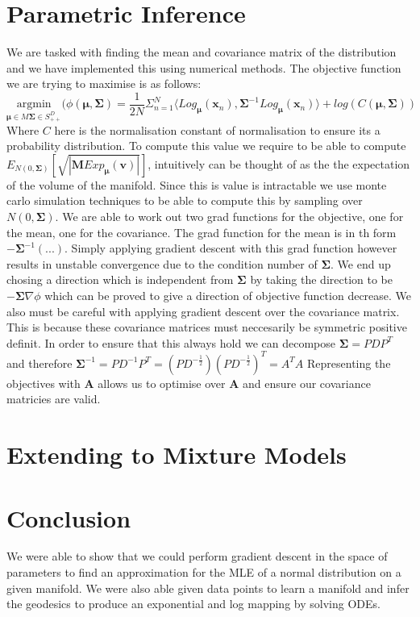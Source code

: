 \documentclass{article}
\begin{document}
\section{Parametric Inference}
We are tasked with finding the mean and covariance matrix of the distribution and we have implemented this using numerical methods.
The objective function we are trying to maximise is as follows:
$$\underset{\bm{\mu} \in M \bm{\Sigma} \in S_{++}^D}{\text{argmin}}(\phi(\bm{\mu},\bm{\Sigma})
=\frac{1}{2N}\Sigma_{n=1}^N\langle Log_{\bm{\mu}}(\bm{x}_n),
\bm{\Sigma}^{-1}Log_{\bm{\mu}}(\bm{x}_n)\rangle
+ log(C(\bm{\mu},\bm{\Sigma}))$$
Where $C$ here is the normalisation constant of normalisation to ensure its a probability distribution.
To compute this value we require to be able to compute $E_{N(0,\bm{\Sigma})}[\sqrt{|\bm{M}Exp_{\bm{\mu}}(\bm{v})|}]$,
intuitively can be thought of as the the expectation of the volume of the manifold.
Since this is value is intractable we use monte carlo simulation techniques to be able to compute this by sampling over $N(0,\bm{\Sigma})$.
We are able to work out two grad functions for the objective, one for the mean, one for the covariance.
The grad function for the mean is in th form $-\bm{\Sigma}^{-1}(...)$.
Simply applying gradient descent with this grad function however results in unstable convergence due to the condition number of $\bm{\Sigma}$.
We end up chosing a direction which is independent from $\bm{\Sigma}$ by taking the direction to be $-\bm{\Sigma}\nabla\phi$ which can be proved to give a direction of objective function decrease.
We also must be careful with applying gradient descent over the covariance matrix.
This is because these covariance matrices must neccesarily be symmetric positive definit.
In order to ensure that this always hold we can decompose $\bm{\Sigma} = PDP^T$ and therefore $\bm{\Sigma}^{-1} = PD^{-1}P^T= (PD^{-\frac{1}{2}})(PD^{-\frac{1}{2}})^T=A^TA$
Representing the objectives with $\bm{A}$ allows us to optimise over $\bm{A}$ and ensure our covariance matricies are valid.
\section{Extending to Mixture Models}
\section{Conclusion}
We were able to show that we could perform gradient descent in the space of parameters to find an approximation for the MLE of a normal distribution on a given manifold.
We were also able given data points to learn a manifold and infer the geodesics to produce an exponential and log mapping by solving ODEs.
\end{document}
